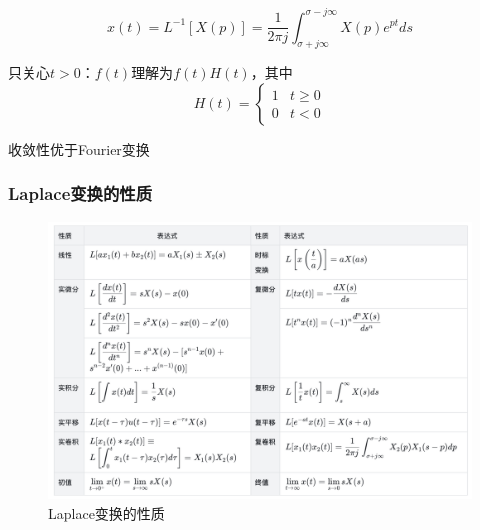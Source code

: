 \begin{dfn}[Laplace逆变换]
    $$x(t)=L^{-1}[X(p)]=\frac{1}{2πj}\int_{\sigma+j\infty}^{\sigma-j\infty}X(p)e^{pt}ds$$
\end{dfn}

只关心$t>0$：$f(t)$理解为$f(t)H(t)$，其中
$$H(t)=\begin{cases}
1 &t\ge0\\
0 &t<0
\end{cases}$$

收敛性优于Fourier变换

\subsubsection{Laplace变换的性质}
\begin{figure}[htpb]
    \centering 
    \includegraphics[width=16.5cm]{figures/LaplaceTransformProperties.png} 
    \caption{Laplace变换的性质}
    \label{LaplaceTransformProperties}
\end{figure}

\newpage
